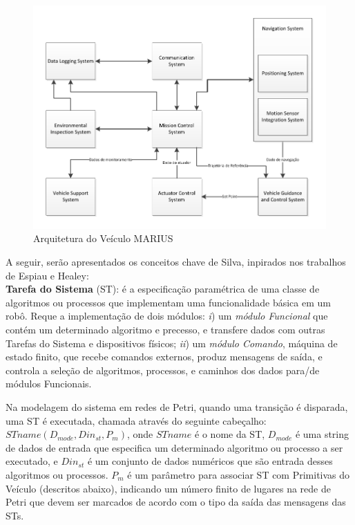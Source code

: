 \begin{figure}[H]
\centering
\includegraphics[width=1\columnwidth]{figs/SILVA_1.pdf}
\caption{Arquitetura do Veículo MARIUS}
\label{SILVA_1}
\end{figure}

A seguir, serão apresentados os conceitos chave de Silva, inpirados nos
trabalhos de Espiau e Healey:\\

\textbf{Tarefa do Sistema} (ST): é a especificação paramétrica de uma classe
de algoritmos ou processos que implementam uma funcionalidade básica em um robô.
Reque a implementação de dois módulos: \textit{i}) um \emph{módulo Funcional}
que contém um determinado algoritmo e precesso, e transfere dados com outras
Tarefas do Sistema e dispositivos físicos; \textit{ii}) um \emph{módulo
Comando}, máquina de estado finito, que recebe comandos externos, produz
mensagens de saída, e controla a seleção de algoritmos, processos, e caminhos
dos dados para/de módulos Funcionais.

Na modelagem do sistema em redes de Petri, quando uma transição é
disparada, uma ST é executada, chamada através do seguinte cabeçalho:
$STname(D_{mode},Din_{st},P_m)$, onde $STname$ é o nome da ST, $D_{mode}$ é uma
string de dados de entrada que especifica um determinado algoritmo ou processo a
ser executado, e $Din_{st}$ é um conjunto de dados numéricos que são entrada
desses algoritmos ou processos. $P_m$ é um parâmetro para associar ST com
Primitivas do Veículo (descritos abaixo), indicando um número finito de lugares
na rede de Petri que devem ser marcados de acordo com o tipo da saída das
mensagens das STs.

